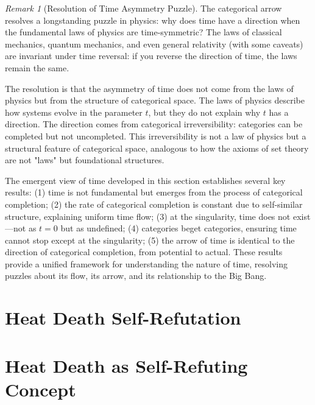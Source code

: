 \documentclass[12pt,a4paper]{article}
\theoremstyle{definition}
\theoremstyle{remark}
\newtheorem{remark}[theorem]{Remark}
\begin{document}
\begin{remark}[Resolution of Time Asymmetry Puzzle]
\label{rem:time_asymmetry}
The categorical arrow resolves a longstanding puzzle in physics: why does time have a direction when the fundamental laws of physics are time-symmetric? The laws of classical mechanics, quantum mechanics, and even general relativity (with some caveats) are invariant under time reversal: if you reverse the direction of time, the laws remain the same.

The resolution is that the asymmetry of time does not come from the laws of physics but from the structure of categorical space. The laws of physics describe how systems evolve in the parameter $t$, but they do not explain why $t$ has a direction. The direction comes from categorical irreversibility: categories can be completed but not uncompleted. This irreversibility is not a law of physics but a structural feature of categorical space, analogous to how the axioms of set theory are not "laws" but foundational structures.
\end{remark}

The emergent view of time developed in this section establishes several key results: (1) time is not fundamental but emerges from the process of categorical completion; (2) the rate of categorical completion is constant due to self-similar structure, explaining uniform time flow; (3) at the singularity, time does not exist—not as $t = 0$ but as undefined; (4) categories beget categories, ensuring time cannot stop except at the singularity; (5) the arrow of time is identical to the direction of categorical completion, from potential to actual. These results provide a unified framework for understanding the nature of time, resolving puzzles about its flow, its arrow, and its relationship to the Big Bang.



\section{Heat Death Self-Refutation}
\label{sec:heat_refutation}
\section{Heat Death as Self-Refuting Concept}
\label{sec:self_refutation}
\end{document}
